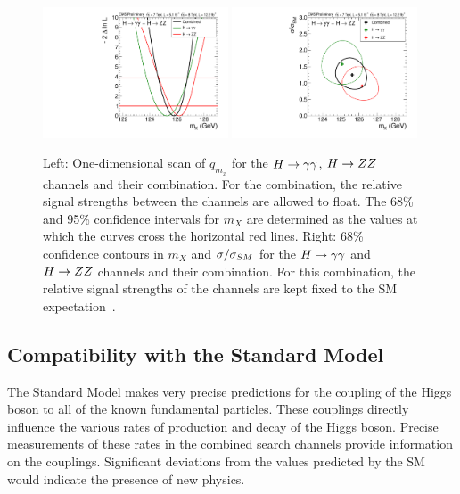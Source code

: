 \begin{figure}
\includegraphics[width=0.49\textwidth]{combinations/Figure_007-b.pdf}
\includegraphics[width=0.49\textwidth]{combinations/Figure_007-a.pdf}
\caption{ Left: One-dimensional scan of $q_{m_{x}}$ for the $H\rightarrow\gamma\gamma$,
$H\rightarrow ZZ$ channels and their combination. For the combination, the relative
signal strengths between the channels are allowed to float. The 68\%
and 95\% confidence intervals for $m_{X}$ are determined as the values at
which the curves cross the horizontal red lines. Right: 68\% confidence
contours in $m_{X}$ and $\sigma/\sigma_{SM}$ for the $H\rightarrow\gamma\gamma$ and $H\rightarrow ZZ$ channels and their
combination. For this combination, the relative signal strengths of the 
channels are kept fixed to the SM expectation~\citep{HIG-12-045}.}
\label{fig:mass}
\end{figure}
\subsection{Compatibility with the Standard Model}
The Standard Model makes very precise predictions for the coupling of the Higgs 
boson to all of the known fundamental particles. These couplings directly influence 
the various rates of production and decay of the Higgs boson. 
Precise measurements of these rates 
in the combined search channels provide information on the couplings. 
Significant deviations from the values predicted by the SM 
would indicate the presence of new physics.

